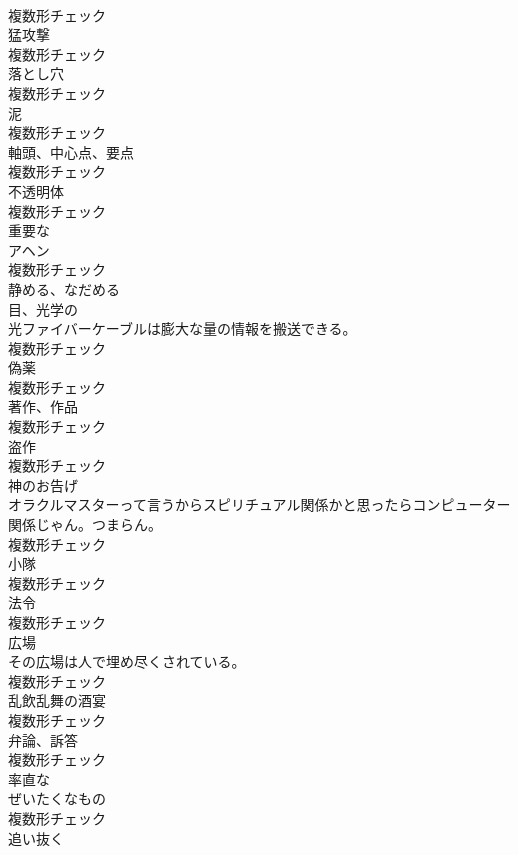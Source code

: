 \documentclass[8pt]{extreport}
\begin{document}
\begin{CJK}{UTF8}{min}
\\	複数形チェック
\\	[名詞]	猛攻撃	
\\	複数形チェック
\\	[名詞]	落とし穴	
\\	複数形チェック
\\	[名詞]	泥	
\\	複数形チェック
\\	[名詞]	軸頭、中心点、要点	
\\	複数形チェック
\\	[名詞]	不透明体	
\\	複数形チェック
\\	[形容詞]	重要な	
\\	[名詞]	アヘン	
\\	複数形チェック
\\	[動詞]	静める、なだめる	
\\	[名詞]	目、光学の	
\\	光ファイバーケーブルは膨大な量の情報を搬送できる。	
\\	複数形チェック
\\	[名詞]	偽薬	
\\	複数形チェック
\\	[名詞]	著作、作品	
\\	複数形チェック
\\	[名詞]	盗作	
\\	複数形チェック
\\	[名詞]	神のお告げ	
\\	オラクルマスターって言うからスピリチュアル関係かと思ったらコンピューター関係じゃん。つまらん。	
\\	複数形チェック
\\	[名詞]	小隊	
\\	複数形チェック
\\	[名詞]	法令	
\\	複数形チェック
\\	[名詞]	広場	
\\	その広場は人で埋め尽くされている。	
\\	複数形チェック
\\	[名詞]	乱飲乱舞の酒宴	
\\	複数形チェック
\\	[名詞]	弁論、訴答	
\\	複数形チェック
\\	[形容詞]	率直な	
\\	[名詞]	ぜいたくなもの	
\\	複数形チェック
\\	[動詞]	追い抜く	

\end{CJK}
\end{document}

